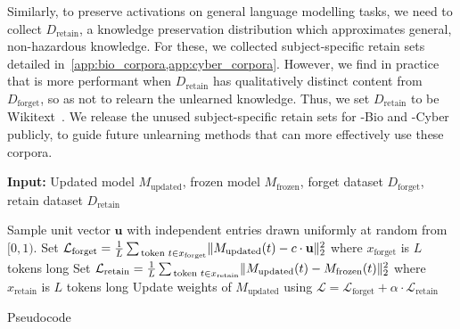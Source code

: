 Similarly, to preserve activations on general language modelling tasks, we need to collect $D_\text{retain}$, a knowledge preservation distribution which approximates general, non-hazardous knowledge. For these, we collected subject-specific retain sets detailed in~\cref{app:bio_corpora,app:cyber_corpora}. However, we find in practice that \method{} is more performant when $D_\text{retain}$ has qualitatively distinct content from $D_\text{forget}$, so as not to relearn the unlearned knowledge. Thus, we set $D_\text{retain}$ to be Wikitext~\citep{merity2016wikitext}. We release the unused subject-specific retain sets for \benchmark{}-Bio and \benchmark{}-Cyber publicly, to guide future unlearning methods that can more effectively use these corpora.























\begin{algorithm}[t!]
	\begin{algorithmic}[1]
		\STATE \textbf{Input:} Updated model $M_\text{updated}$, frozen model $M_\text{frozen}$, forget dataset $D_\text{forget}$, retain dataset $D_\text{retain}$ 
           

  
        \STATE Sample unit vector $\mathbf{u}$ with independent entries drawn uniformly at random from $[0, 1)$.
        \STATE Set $\mathcal{L}_\text{forget} = \frac{1}{L}\sum_{\,\text{token } t \in x_\text{forget}} \lVert M_\text{updated}(t) -c \cdot \mathbf{u}\rVert_2^2 $ where $x_\text{forget}$ is $L$ tokens long
        \STATE Set $\mathcal{L}_\text{retain} = \frac{1}{L} \sum_{\,\text{token } t \in x_\text{retain}}\lVert M_\text{updated}(t) - M_\text{frozen}(t)\rVert_2^2$ where $x_\text{retain}$ is $L$ tokens long
        \STATE Update weights of $M_\text{updated}$ using $\mathcal{L} = \mathcal{L}_\text{forget} + \alpha \cdot \mathcal{L}_\text{retain}$ 
		\ENDFOR
        \EndFunction





		\end{algorithmic}
	\caption{\method{} Pseudocode}
	\label{algo:cut}
\end{algorithm}
